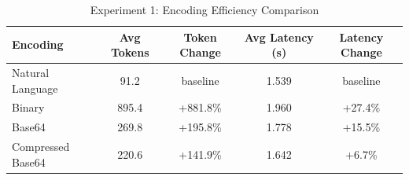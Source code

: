 \begin{table}[htbp]
\centering
\caption{Experiment 1: Encoding Efficiency Comparison}
\begin{tabular}{lcccc}
\toprule
Encoding & Avg Tokens & Token Change & Avg Latency (s) & Latency Change \\
\midrule
Natural Language & 91.2 & baseline & 1.539 & baseline \\
Binary & 895.4 & +881.8\% & 1.960 & +27.4\% \\
Base64 & 269.8 & +195.8\% & 1.778 & +15.5\% \\
Compressed Base64 & 220.6 & +141.9\% & 1.642 & +6.7\% \\
\bottomrule
\end{tabular}
\label{tab:exp1_results}
\end{table}
